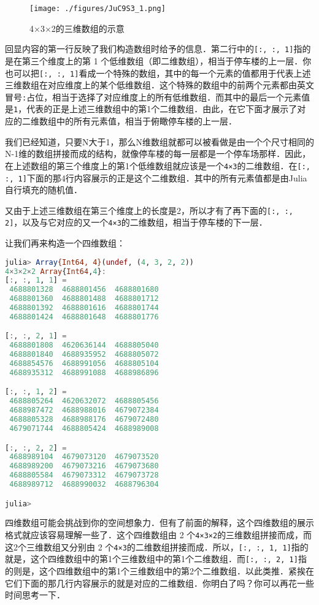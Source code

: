 \begin{figure}[ht]
\centering
\texttt{[image: ./figures/JuC9S3\_1.png]}
\caption{4×3×2的三维数组的示意} \label{JuC9S3_fig1}
\end{figure}


回显内容的第一行反映了我们构造数组时给予的信息．第二行中的\verb|[:, :, 1]|指的是在第三个维度上的第 1 个低维数组（即二维数组），相当于停车楼的上一层．你也可以把\verb|[:, :, 1]|看成一个特殊的数组，其中的每一个元素的值都用于代表上述三维数组在对应维度上的某个低维数组．这个特殊的数组中的前两个元素都由英文冒号\verb|:|占位，相当于选择了对应维度上的所有低维数组．而其中的最后一个元素值是\verb|1|，代表的正是上述三维数组中的第1个二维数组．由此，在它下面才展示了对应的二维数组中的所有元素值，相当于俯瞰停车楼的上一层．

我们已经知道，只要N大于1，那么N维数组就都可以被看做是由一个个尺寸相同的N-1维的数组拼接而成的结构，就像停车楼的每一层都是一个停车场那样．因此，在上述数组的第三个维度上的第1个低维数组就应该是一个\verb|4×3|的二维数组．在\verb|[:, :, 1]|下面的那4行内容展示的正是这个二维数组．其中的所有元素值都是由Julia自行填充的随机值．

又由于上述三维数组在第三个维度上的长度是2，所以才有了再下面的\verb|[:, :, 2]|，以及与它对应的又一个\verb|4×3|的二维数组，相当于停车楼的下一层．

让我们再来构造一个四维数组：

\begin{lstlisting}[language=julia]
julia> Array{Int64, 4}(undef, (4, 3, 2, 2))
4×3×2×2 Array{Int64,4}:
[:, :, 1, 1] =
 4688801328  4688801456  4688801680
 4688801360  4688801488  4688801712
 4688801392  4688801616  4688801744
 4688801424  4688801648  4688801776

[:, :, 2, 1] =
 4688801808  4620636144  4688805040
 4688801840  4688935952  4688805072
 4688854576  4688991056  4688805104
 4688935312  4688991088  4688986896

[:, :, 1, 2] =
 4688805264  4620632072  4688805456
 4688987472  4688988016  4679072384
 4688805328  4688988176  4679072480
 4679071744  4688805424  4688989008

[:, :, 2, 2] =
 4688989104  4679073120  4679073520
 4688989200  4679073216  4679073680
 4688805584  4679073312  4679073728
 4688989712  4688990032  4688796304

julia> 
\end{lstlisting}

四维数组可能会挑战到你的空间想象力．但有了前面的解释，这个四维数组的展示格式就应该容易理解一些了．这个四维数组由 2 个\verb|4×3×2|的三维数组拼接而成，而这2个三维数组又分别由 2 个\verb|4×3|的二维数组拼接而成．所以，\verb|[:, :, 1, 1]|指的就是，这个四维数组中的第1个三维数组中的第1个二维数组．而\verb|[:, :, 2, 1]|指的则是，这个四维数组中的第1个三维数组中的第2个二维数组．以此类推．紧挨在它们下面的那几行内容展示的就是对应的二维数组．你明白了吗？你可以再花一些时间思考一下．

